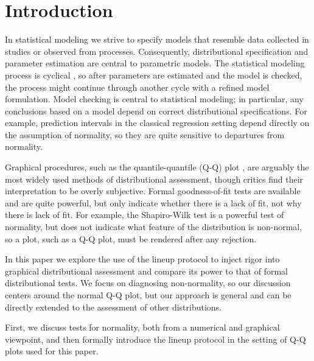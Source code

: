 \documentclass[12pt]{article}\usepackage[]{graphicx}\usepackage[]{color}
\newcommand{\alnote}[1]{\todo[inline,color=green!40]{#1}}
\begin{document}
\section{Introduction}

In statistical modeling we strive to specify models that resemble data collected in studies or observed from processes. Consequently, %
distributional specification and parameter estimation are central to parametric models.
The statistical modeling process is cyclical \citep{tukey:eda}, so after parameters are estimated and the model is checked, the process might continue through another cycle with a refined model formulation. Model checking is central to statistical modeling; in particular, any conclusions based on a model depend  on  correct distributional specifications. For example, prediction intervals in the classical regression setting depend directly on the assumption of normality, so they are quite sensitive to departures from normality. 

Graphical procedures, such as the quantile-quantile (Q-Q) plot \citep{Wilk:1968}, are arguably the most widely used methods of distributional assessment, though critics find their interpretation to be overly subjective. Formal goodness-of-fit tests are available and are quite powerful, but only indicate whether there is a lack of fit, not why there is lack of fit. For example, the Shapiro-Wilk test \citep{Shapiro:1965kt} is a powerful test of normality, but does not indicate what feature of the distribution is non-normal, so a plot, such as a Q-Q plot, must be rendered after any rejection. 

In this paper we explore the use of the lineup protocol \citep{buja:2009hp} to inject rigor into graphical distributional assessment and compare its power to that of formal distributional tests. We focus on diagnosing non-normality, so our discussion centers around the normal Q-Q plot, but our approach is general and can be directly extended to the assessment of other distributions.


First, we discuss  tests for normality, both from a numerical and graphical viewpoint, and then formally introduce the lineup protocol in the setting of Q-Q plots used for this paper.
\end{document}
